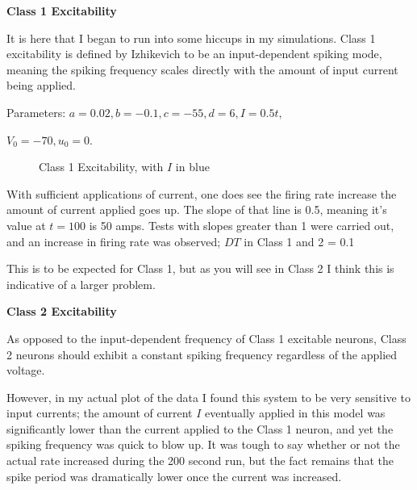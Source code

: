 \documentclass[a4paper,12pt]{article}
\begin{document}
{\bf Class 1 Excitability}
\bigskip

It is here that I began to run into some hiccups in my simulations. Class 1 excitability is defined by Izhikevich to be an input-dependent spiking mode, meaning the spiking frequency scales directly with the amount of input current being applied. 

\vspace{2mm} 

Parameters: $a=0.02, b=-0.1, c=-55, d=6, I=0.5t, $

\vspace{1mm}

$V_{0}=-70, u_{0}=0$. 

\begin{figure}[h!]
\begin{center}
\end{center}
\caption{\label{pict7}Class 1 Excitability, with $I$ in blue}
\end{figure}

With sufficient applications of current, one does see the firing rate increase the amount of current applied goes up. The slope of that line is 0.5, meaning it's value at $t=100$ is 50 amps. Tests with slopes greater than 1 were carried out, and an increase in firing rate was observed; $DT$ in Class 1 and 2 = 0.1

\vspace{2mm}

This is to be expected for Class 1, but as you will see in Class 2 I think this is indicative of a larger problem. 

\vfil\eject

{\bf Class 2 Excitability}
\bigskip

As opposed to the input-dependent frequency of Class 1 excitable neurons, Class 2 neurons should exhibit a constant spiking frequency regardless of the applied voltage. 

\vspace{2mm}

However, in my actual plot of the data I found this system to be very sensitive to input currents; the amount of current $I$ eventually applied in this model was significantly lower than the current applied to the Class 1 neuron, and yet the spiking frequency was quick to blow up. It was tough to say whether or not the actual rate increased during the 200 second run, but the fact remains that the spike period was dramatically lower once the current was increased. 
 
\end{document}
